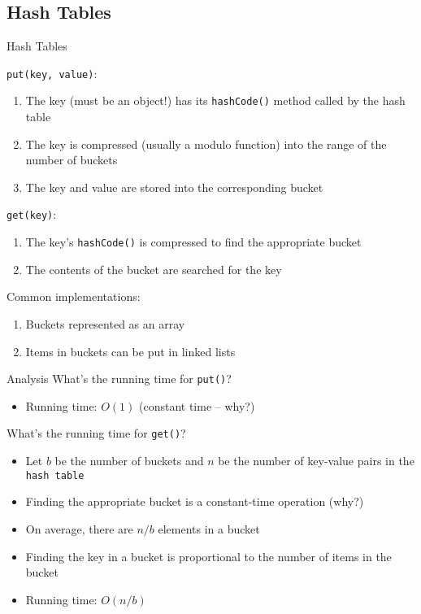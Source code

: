 \documentclass[9pt]{beamer}
\begin{document}
\subsection{Hash Tables}
\begin{frame}{Hash Tables}

  {\tt put(key, value)}:
  \begin{enumerate}
    \pause
    \item
      The key (must be an object!) has its {\tt hashCode()} method called by
      the hash table
    \pause
    \item
      The key is compressed (usually a modulo function) into the range of
      the number of buckets
    \pause
    \item
      The key and value are stored into the corresponding bucket
  \end{enumerate}

  \vspace{1em}
  {\tt get(key)}:
  \begin{enumerate}
    \pause
    \item
      The key's {\tt hashCode()} is compressed to find the appropriate
      bucket
    \pause
    \item
      The contents of the bucket are searched for the key
  \end{enumerate}

  \pause
  Common implementations:
  \begin{enumerate}
    \pause
    \item
      Buckets represented as an array
    \pause
    \item
      Items in buckets can be put in linked lists
  \end{enumerate}
\end{frame}

\begin{frame}{Analysis}
  What's the running time for {\tt put()}?
  \begin{itemize}
    \pause
    \item
      Running time: $O(1)$ (constant time -- why?)
  \end{itemize}

  \vspace{1em}
  What's the running time for {\tt get()}?
  \begin{itemize}
    \pause
    \item
      Let $b$ be the number of buckets and $n$ be the number of key-value
      pairs in the {\tt hash table}
    \pause
    \item
      Finding the appropriate bucket is a constant-time operation (why?)
    \pause
    \item
      On average, there are $n/b$ elements in a bucket
    \pause
    \item
      Finding the key in a bucket is proportional to the number of items in the bucket
    \pause
    \item
      Running time: $O(n/b)$
  \end{itemize}
\end{frame}
\end{document}
